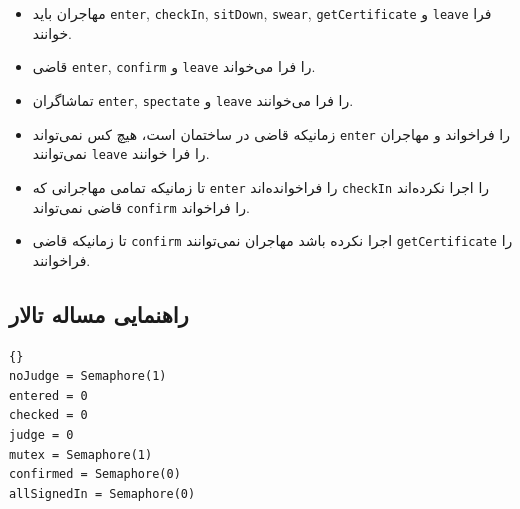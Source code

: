 \documentclass{book}
\newcommand{\clearemptydoublepage}{\newpage\cleardoublepage}
\begin{document}
\begin{itemize}

\item %
    مهاجران باید {\tt enter}, {\tt checkIn}, {\tt sitDown}, {\tt swear}, {\tt getCertificate} و {\tt leave} 
    فرا خوانند. 

\item %
    قاضی {\tt enter}, {\tt confirm} و {\tt leave}  را فرا می‌خواند. 

\item%
    تماشاگران {\tt enter}, {\tt spectate} و {\tt leave} را فرا می‌خوانند. 

\item %
    زمانیکه قاضی در ساختمان است، هیچ کس نمی‌تواند {\tt enter} را فراخواند و مهاجران نمی‌توانند  {\tt leave} را فرا خوانند. 

\item %
    تا زمانیکه تمامی مهاجرانی که {\tt enter} را فراخوانده‌اند  {\tt checkIn} را  اجرا نکرده‌اند  قاضی نمی‌تواند  {\tt confirm} را فراخواند.

\item %
    تا زمانیکه قاضی {\tt confirm} اجرا نکرده باشد مهاجران نمی‌توانند {\tt getCertificate} را فراخوانند. 

\end{itemize}

\clearemptydoublepage
\subsection{راهنمایی مساله تالار }

\begin{latin}
\begin{lstlisting}[title=\rl{راهنمایی مساله تالار \lr{Faneuil}}]{}
noJudge = Semaphore(1)
entered = 0
checked = 0
judge = 0
mutex = Semaphore(1)
confirmed = Semaphore(0)
allSignedIn = Semaphore(0)
\end{lstlisting}
\end{latin}
\end{document}
